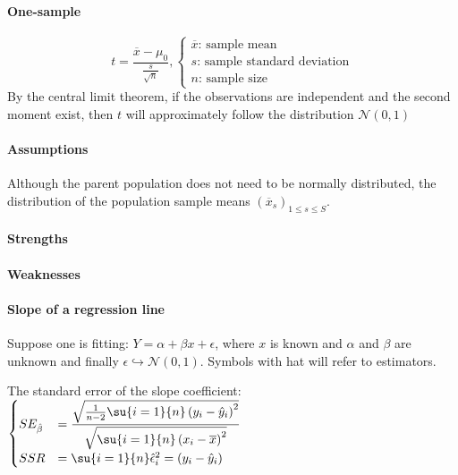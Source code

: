 \paragraph{One-sample}
$$
t = \dfrac{\overline{x} - \mu_{0}}{\frac{s}{\sqrt{n}}},
\begin{cases}
    \overline{x}\text{: sample mean}\\
    s\text{: sample standard deviation}\\
    n\text{: sample size}
\end{cases}
$$
By the central limit theorem, if the observations are independent and the second
moment exist, then $t$ will approximately follow the distribution $\mathcal{N}(0, 1)$

\paragraph{Assumptions}
Although the parent population does not need to be normally distributed, the distribution
of the population sample means $\left(\overline{x}_{s}\right)_{1\leq s\leq S}$.\\
\paragraph{Strengths}
\paragraph{Weaknesses}


\paragraph{Slope of a regression line}
Suppose one is fitting: $Y = \alpha + \beta x + \epsilon$, where $x$ is known and $\alpha$ and $\beta$ are unknown
and finally $\epsilon \hookrightarrow \mathcal{N(0, 1)}$.
Symbols with hat will refer to estimators.
\begin{center}
\end{center}
The standard error of the slope coefficient:
$\begin{cases}
    SE_{\hat{\beta}} &= \dfrac{\sqrt{\frac{1}{n-2}\su{i=1}{n}\left(y_{i}-
    \hat{y}_{i}\right)^{2}}}{
    \sqrt{\su{i=1}{n}\left(x_{i} - \overline{x}\right)^{2}}}\\
                SSR &= \su{i=1}{n}\hat{\epsilon}^{2}_{i} = \left(y_{i} - \hat{y}_{i}
                \right)
\end{cases}$

